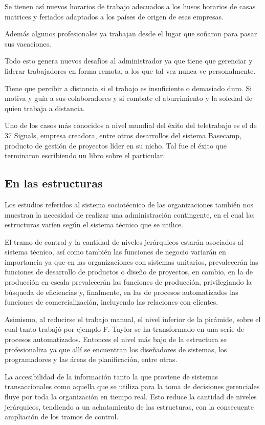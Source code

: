 \documentclass[a4paper, 12pt]{article}
\begin{document}
Se tienen así nuevos horarios de trabajo adecuados a los husos horarios de casas matrices y feriados adaptados a los países de origen de esas empresas. 

Además algunos profesionales ya trabajan desde el lugar que soñaron para pasar sus vacaciones.

Todo esto genera nuevos desafíos al administrador ya que tiene que gerenciar y liderar trabajadores en forma remota, a los que tal vez nunca ve personalmente.

Tiene que percibir a distancia si el trabajo es insuficiente o demasiado duro. Si motiva y guía a sus colaboradores y si combate el aburrimiento y la soledad de quien trabaja a distancia.

Uno de los casos más conocidos a nivel mundial del éxito del teletrabajo es el de 37 Signals, empresa creadora, entre otros desarrollos del sistema Basecamp, producto de gestión de proyectos líder en su nicho. Tal fue el éxito que terminaron escribiendo un libro sobre el particular\cite{FriedHansson2013}.

\subsection{En las estructuras}
Los estudios referidos al sistema sociotécnico de las organizaciones también nos muestran la necesidad de realizar una administración contingente, en el cual las estructuras varíen según el sistema técnico que se utilice.

El tramo de control y la cantidad de niveles jerárquicos estarán asociados al sistema técnico, así como también las funciones de negocio variarán en importancia ya que en las organizaciones con sistemas unitarios, prevalecerán las funciones de desarrollo de productos o diseño de proyectos, en cambio, en la de producción en escala prevalecerán las funciones de producción, privilegiando la búsqueda de eficiencias y, finalmente, en las de procesos automatizados las funciones de comercialización, incluyendo las relaciones con clientes.

Asimismo, al reducirse el trabajo manual, el nivel inferior de la pirámide, sobre el cual tanto trabajó por ejemplo F. Taylor se ha transformado en una serie de procesos automatizados. Entonces el nivel más bajo de la estructura se profesionaliza ya que allí se encuentran los diseñadores de sistemas, los programadores y las áreas de planificación, entre otras.

La accesibilidad de la información tanto la que proviene de sistemas transaccionales como aquella que se utiliza para la toma de decisiones gerenciales fluye por toda la organización en tiempo real. Esto reduce la cantidad de niveles jerárquicos, tendiendo a un achatamiento de las estructuras, con la consecuente ampliación de los tramos de control.
\end{document}
